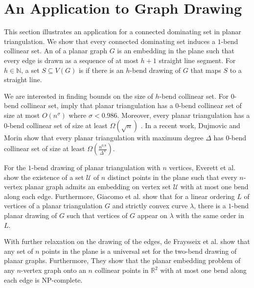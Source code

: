 \section{An Application to Graph Drawing}
\label{one_bend}
This section illustrates an application for a connected dominating set in planar triangulation. We show that every connected dominating set induces a $1$-bend collinear set. An  of a planar graph $G$ is an embedding in the plane such that every edge is drawn as a sequence of at most $h + 1$ straight line segment. For $h \in \mathbb{N}$, a set $S \subseteq V(G)$ is  if there is an $h$-bend drawing of $G$ that maps $S$ to a straight line.

We are interested in finding bounds on the size of $h$-bend collinear set. For $0$-bend collinear set, \cite{DBLP:journals/jct/GrunbaumW73}\cite{DBLP:conf/wg/RavskyV11}\cite{DBLP:journals/jocg/LozzoDFMR18} imply that planar triangulation has a 0-bend collinear set of size at most $O(n^{\sigma})$ where $\sigma < 0.986$. Moreover, every planar triangulation has a 0-bend collinear set of size at least $\Omega(\sqrt{n})$ \cite{DBLP:journals/dcg/BoseDHLMW09} \cite{DBLP:journals/jgaa/Dujmovic17}. In a recent work, Dujmovic and Morin \cite{DBLP:conf/compgeom/DujmovicM19} show that every planar triangulation with maximum degree $\Delta$ has $0$-bend collinear set of size at least $\Omega(\frac{n^{0.8}}{\Delta^4})$.

For the $1$-bend drawing of planar triangulation with $n$ vertices,  Everett et al. \cite{DBLP:conf/gd/EverettLLW07} show the existence of a set $\mathcal{U}$ of $n$ distinct points in the plane such that every $n$-vertex planar graph admits an embedding on vertex set $\mathcal{U}$ with at most one bend along each edge. Furthermore, Giacomo et al. \cite{DBLP:journals/comgeo/GiacomoDLW05} show that for a linear ordering $L$ of vertices of a planar triangulation $G$ and strictly convex curve $\lambda$, there is a $1$-bend planar drawing of $G$ such that vertices of $G$ appear on $\lambda$ with the same order in $L$.

With further relaxation on the drawing of the edges, de Fraysseix et al. \cite{DBLP:journals/combinatorica/FraysseixPP90} show that any set of $n$ points in the plane is a universal set for the two-bend drawing of planar graphs. Furthermore, They show that the planar embedding problem of any $n$-vertex graph onto an $n$ collinear points in $\mathbb{R}^2$ with at most one bend along each edge is NP-complete.

